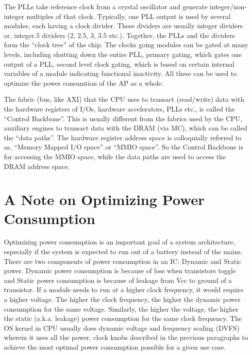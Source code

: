 The PLLs take reference clock from a crystal oscillator and generate integer/non-integer multiples of that clock.  Typically, one PLL output is used by several modules, each having a clock divider. These dividers are usually integer dividers or, integer.5 dividers (2, 2.5, 3, 3.5 etc.). Together, the PLLs and the dividers form the ``clock tree'' of the chip. The clocks going modules can be gated at many levels, including shutting down the entire PLL, primary gating, which gates one output of a PLL, second level clock gating, which is based on certain internal variables of a module indicating functional inactivity. All these can be used to optimize the power consumtion of the AP as a whole. 

The fabric (bus, like AXI) that the CPU uses to transact (read/write) data with the hardware registers of I/Os, hardware accelerators, PLLs etc., is called the ``Control Backbone''. This is usually different from the fabrics used by the CPU, auxiliary engines to transact data with the DRAM (via MC), which can be called the ``data paths''. The hardware register address space is colloquially referred to as, ``Memory Mapped I/O space'' or ``MMIO space''. So the Control Backbone is for accessing the MMIO space, while the data paths are used to access the DRAM address space. 

\section{A Note on Optimizing Power Consumption}
Optimizing power consumption is an important goal of a system architecture, especially if the system is expected to run out of a battery instead of the mains. There are two components of power consumption in an IC: Dynamic and Static power. Dynamic power consumption is because of loss when transistors toggle and Static power consumption is because of leakage from Vcc to ground of a transistor. If a module needs to run at a higher clock frequency, it would require a higher voltage. The higher the clock frequency, the higher the dynamic power consumption for the same voltage. Similarly, the higher the voltage, the higher the static (a.k.a. leakage) power consumption for the same clock frequency. The OS kernel in CPU usually does dynamic voltage and frequency scaling (DVFS) wherein it uses all the power, clock knobs described in the previous paragraphs to achieve the most optimal power consumption possible for a given use case. 
 
